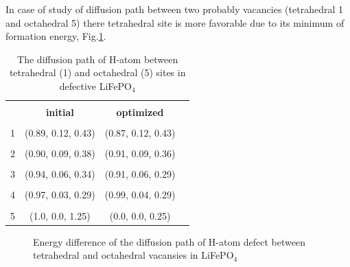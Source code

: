 \documentclass[11pt]{article}
\begin{document}
In case of study of diffusion path between two probably vacancies (tetrahedral 1 and octahedral 5) there tetrahedral site is more favorable due to its minimum of formation energy, Fig.\ref{difpath}. 

\begin{table}[H]
\caption{The diffusion path of H-atom between tetrahedral (1) and octahedral (5) sites in defective LiFePO$_4$}
\label{tabular:difpath}
\begin{center}
\begin{tabular}{|c|c|c|c|}
\hline
& & \\
 \textbf{ } & \textbf{initial}& \textbf{optimized}  \\ 
\hline
& & \\
1 & (0.89, 0.12, 0.43) &  (0.87, 0.12, 0.43) \\ 
\hline
& & \\
2 & (0.90, 0.09, 0.38) & (0.91, 0.09, 0.36) \\
\hline
& & \\
3 & (0.94, 0.06, 0.34) & (0.91, 0.06, 0.29) \\
\hline
& & \\
4 & (0.97, 0.03, 0.29) & (0.99, 0.04, 0.29) \\
\hline
& & \\
5 & (1.0, 0.0, 1.25) &  (0.0, 0.0, 0.25)  \\
\hline
\end{tabular}
\end{center}
\end{table}

\begin{figure}[H]
\begin{minipage}[h]{1\linewidth}
\end{minipage}
\caption{Energy difference of the diffusion path of H-atom defect between tetrahedral and octahedral vacansies in LiFePO$_4$}
\label{difpath}
\end{figure}
\end{document}
